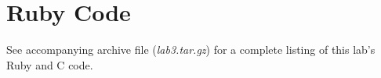 \chapter{Ruby Code}\label{app:code}
See accompanying archive file (\emph{lab3.tar.gz}) for a complete listing of this lab's Ruby and C code.
